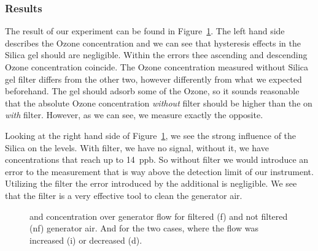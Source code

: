 \subsubsection{Results}
\label{sec:silica-results}

The result of our experiment can be found in
Figure~\ref{fig:o3-flow}. The left hand side describes the Ozone
concentration and we can see that hysteresis effects in the Silica gel
should are negligible. Within the errors thee ascending and descending
Ozone concentration coincide. The Ozone concentration measured without
Silica gel filter differs from the other two, however differently from
what we expected beforehand. The gel should adsorb some of the Ozone,
so it sounds reasonable that the absolute Ozone concentration
\emph{without} filter should be higher than the on \emph{with}
filter. However, as we can see, we measure exactly the opposite. 

Looking at the right hand side of Figure~\ref{fig:o3-flow}, we see the
strong influence of the Silica on the  levels. With filter, we
have no  signal, without it, we have concentrations that reach
up to \SI{14}{ppb}. So without filter we would introduce an error to
the  measurement that is way above the detection limit of our
instrument. Utilizing the filter the error introduced by the
additional  is negligible. We see that the filter is a very
effective tool to clean the generator air.

\begin{figure}[htbp]
  \centering
  
  \hfill
  
  \caption{ and  concentration over generator flow for
    filtered (f) and not filtered (nf) generator air. And for the two
    cases, where the flow was increased (i) or decreased (d).}
  \label{fig:o3-flow}
\end{figure}

